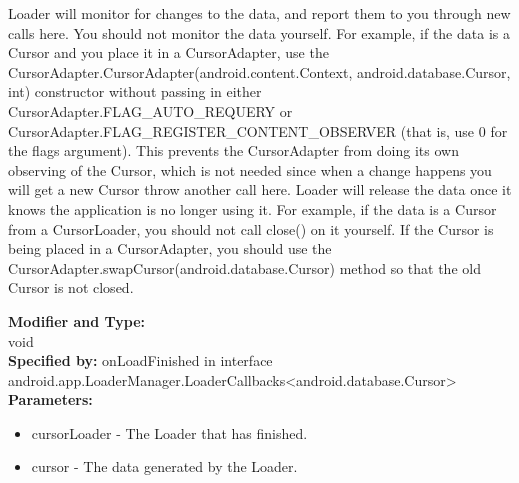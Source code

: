 \begin{itemize}
\itemThe Loader will monitor for changes to the data, and report them to you through new calls here. You should not monitor the data yourself. For example, if the data is a Cursor and you place it in a CursorAdapter, use the CursorAdapter.CursorAdapter(android.content.Context, android.database.Cursor, int) constructor without passing in either CursorAdapter.FLAG\_AUTO\_REQUERY or CursorAdapter.FLAG\_REGISTER\_CONTENT\_OBSERVER (that is, use 0 for the flags argument). This prevents the CursorAdapter from doing its own observing of the Cursor, which is not needed since when a change happens you will get a new Cursor throw another call here. 
\itemThe Loader will release the data once it knows the application is no longer using it. For example, if the data is a Cursor from a CursorLoader, you should not call close() on it yourself. If the Cursor is being placed in a CursorAdapter, you should use the CursorAdapter.swapCursor(android.database.Cursor) method so that the old Cursor is not closed. 
\end{itemize}

\textbf{Modifier and Type:}\\
\tab void\\

\textbf{Specified by:}
\tab                            onLoadFinished in interface android.app.LoaderManager.LoaderCallbacks<android.database.Cursor>\\


\textbf{Parameters:}
\begin{itemize}
\item cursorLoader - The Loader that has finished.
\item cursor - The data generated by the Loader.
\end{itemize}


